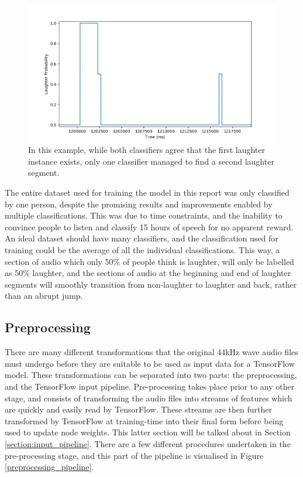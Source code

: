 \documentclass[a4paper,11pt,notitlepage]{article}
\begin{document}
\begin{figure}[H]
	\centering
	\vspace{0.5cm}
	\includegraphics[scale = 0.7]{figs/differences_2.png}
	\caption{In this example, while both classifiers agree that the first laughter instance exists, only one classifier managed to find a second laughter segment.}
	\label{laughter_classification_differences_2}
\end{figure}
The entire dataset used for training the model in this report was only classified by one person, despite the promising results and improvements enabled by multiple classifications. This was due to time constraints, and the inability to convince people to listen and classify 15 hours of speech for no apparent reward. An ideal dataset should have many classifiers, and the classification used for training could be the average of all the individual classifications. This way, a section of audio which only 50\% of people think is laughter, will only be labelled as 50\% laughter, and the sections of audio at the beginning and end of laughter segments will smoothly transition from non-laughter to laughter and back, rather than an abrupt jump.

\subsection{Preprocessing}


There are many different transformations that the original 44kHz wave audio files must undergo before they are suitable to be used as input data for a TensorFlow model. These transformations can be separated into two parts: the preprocessing, and the TensorFlow input pipeline. Pre-processing takes place prior to any other stage, and consists of transforming the audio files into streams of features which are quickly and easily read by TensorFlow. These streams are then further transformed by TensorFlow at training-time into their final form before being used to update node weights. This latter section will be talked about in Section \ref{section:input_pipeline}. There are a few different procedures undertaken in the pre-processing stage, and this part of the pipeline is visualised in Figure \ref{preprocessing_pipeline}.
\end{document}
